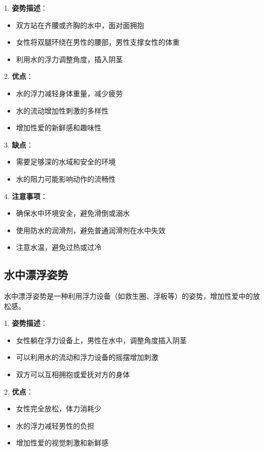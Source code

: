 \documentclass[12pt,UTF8]{ctexbook}
\begin{document}
1. \textbf{姿势描述}：
  \begin{itemize}
  \item 双方站在齐腰或齐胸的水中，面对面拥抱
  \item 女性将双腿环绕在男性的腰部，男性支撑女性的体重
  \item 利用水的浮力调整角度，插入阴茎
  \end{itemize}

2. \textbf{优点}：
  \begin{itemize}
  \item 水的浮力减轻身体重量，减少疲劳
  \item 水的流动增加性刺激的多样性
  \item 增加性爱的新鲜感和趣味性
  \end{itemize}

3. \textbf{缺点}：
  \begin{itemize}
  \item 需要足够深的水域和安全的环境
  \item 水的阻力可能影响动作的流畅性
  \end{itemize}

4. \textbf{注意事项}：
  \begin{itemize}
  \item 确保水中环境安全，避免滑倒或溺水
  \item 使用防水的润滑剂，避免普通润滑剂在水中失效
  \item 注意水温，避免过热或过冷
  \end{itemize}

\subsection{水中漂浮姿势}

水中漂浮姿势是一种利用浮力设备（如救生圈、浮板等）的姿势，增加性爱中的放松感。

1. \textbf{姿势描述}：
  \begin{itemize}
  \item 女性躺在浮力设备上，男性在水中，调整角度插入阴茎
  \item 可以利用水的流动和浮力设备的摇摆增加刺激
  \item 双方可以互相拥抱或爱抚对方的身体
  \end{itemize}

2. \textbf{优点}：
  \begin{itemize}
  \item 女性完全放松，体力消耗少
  \item 水的浮力减轻男性的负担
  \item 增加性爱的视觉刺激和新鲜感
  \end{itemize}
\end{document}
